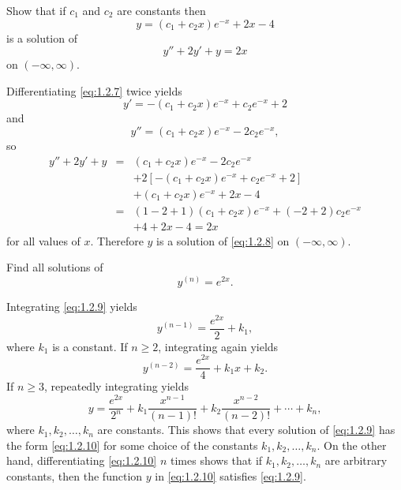 \documentclass{ximera}
\begin{document}
\begin{example}\label{example:1.2.3}
 Show that if $c_1$ and $c_2$ are constants then
\begin{equation} \label{eq:1.2.7}
y=(c_1+c_2x)e^{-x}+2x-4
\end{equation}
 is a solution of
\begin{equation} \label{eq:1.2.8}
y''+2y'+y=2x
\end{equation}
 on $(-\infty,\infty)$.
 
\begin{explanation}
Differentiating \eqref{eq:1.2.7} twice yields
$$
y'=-(c_1+c_2x)e^{-x}+c_2e^{-x}+2
$$
 and
$$
y''=(c_1+c_2x)e^{-x}-2c_2e^{-x},
$$
so
\begin{eqnarray*}
y''+2y'+y&=&(c_1+c_2x)e^{-x}-2c_2e^{-x}\\
&&+2\left[-(c_1+c_2x)e^{-x}+c_2e^{-x}+2\right]\\
&&+(c_1+c_2x)e^{-x}+2x-4\\
&=&(1-2+1)(c_1+c_2x)e^{-x}+(-2+2)c_2e^{-x}\\ &&+4+2x-4=2x
\end{eqnarray*}
for all values of $x$.
Therefore $y$ is a solution of \eqref{eq:1.2.8} on $(-\infty,\infty)$.
\end{explanation}
\end{example}
 
\begin{example}\label{example:1.2.4}
Find all solutions of
\begin{equation} \label{eq:1.2.9}
y^{(n)}=e^{2x}.
\end{equation}
 
\begin{explanation} Integrating \eqref{eq:1.2.9} yields
$$
y^{(n-1)}=\frac{e^{2x}}{2}+k_1,
$$
 where $k_1$ is a constant. If $n\geq 2$,
integrating again yields
$$
y^{(n-2)}=\frac{e^{2x}}{4}+k_1x+k_2.
$$
If $n\geq 3$, repeatedly integrating yields
\begin{equation} \label{eq:1.2.10}
y=\frac{e^{2x}}{2^n}+k_1\frac{x^{n-1}}{(n-1)!}+k_2\frac{x^{n-2}}{(n-2)!}+\cdots+k_n,
\end{equation}
 where $k_1, k_2, \dots, k_n$ are constants.
This shows that every solution of \eqref{eq:1.2.9} has the form
\eqref{eq:1.2.10}
for some choice of the constants $k_1, k_2, \dots, k_n$.
On the other hand, differentiating \eqref{eq:1.2.10}  $n$ times shows
that if
$k_1, k_2, \dots, k_n$ are arbitrary constants, then the function $y$
in
\eqref{eq:1.2.10} satisfies \eqref{eq:1.2.9}.
\end{explanation}
\end{example}
 
\end{document}
